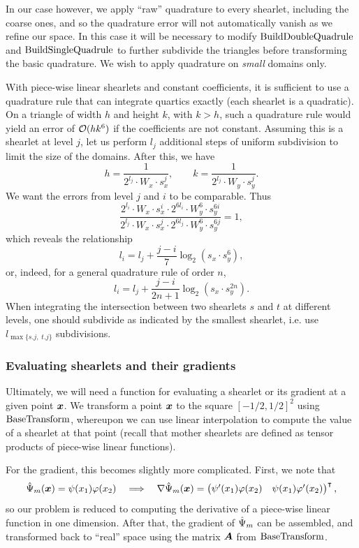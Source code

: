 In our case however, we apply ``raw'' quadrature to every shearlet, including the coarse ones, and so the
quadrature error will not automatically vanish as we refine our space. In this case it will be necessary to
modify $\operatorname{BuildDoubleQuadrule}$ and $\operatorname{BuildSingleQuadrule}$ to further subdivide the triangles before transforming the
basic quadrature. We wish to apply quadrature on {\em small} domains only.

With piece-wise linear shearlets and constant coefficients, it is sufficient to use a quadrature rule that can
integrate quartics exactly (each shearlet is a quadratic). On a triangle of width $h$ and height $k$, with
$k>h$, such a quadrature rule would yield an error of $\mathcal{O}(hk^6)$ if the coefficients are not constant.
Assuming this is a shearlet at level $j$, let us perform $l_j$ additional steps of uniform subdivision to
limit the size of the domains. After this, we have
\[
    h = \frac{1}{2^{l_j}\cdot W_x\cdot s_x^j},\qquad k = \frac{1}{2^{l_j}\cdot W_y\cdot s_y^j}. 
\]
We want the errors from level $j$ and $i$ to be comparable. Thus
\[
    \frac{2^{l_i}\cdot W_x\cdot s_x^i\cdot 2^{6l_i}\cdot W_y^6\cdot s_y^{6i}}
         {2^{l_j}\cdot W_x\cdot s_x^j\cdot 2^{6l_j}\cdot W_y^6\cdot s_y^{6j}} = 1,
\]
which reveals the relationship
\[
    l_i = l_j + \frac{j-i}{7}\log_2\left(s_x\cdot s_y^6\right),
\]
or, indeed, for a general quadrature rule of order $n$,
\[
    l_i = l_j + \frac{j-i}{2n+1}\log_2\left(s_x\cdot s_y^{2n}\right).
\]
When integrating the intersection between two shearlets $s$ and $t$ at different levels, one should subdivide
as indicated by the smallest shearlet, i.e. use $l_{\max\{s.j,\;t.j\}}$ subdivisions.

\subsubsection{Evaluating shearlets and their gradients}

Ultimately, we will need a function for evaluating a shearlet or its gradient at a given point ${\bm x}$.  We
transform a point ${\bm x}$ to the square $[-1/2,1/2]^2$ using $\operatorname{BaseTransform}$, whereupon we can use linear
interpolation to compute the value of a shearlet at that point (recall that mother shearlets are defined as
tensor products of piece-wise linear functions).

For the gradient, this becomes slightly more complicated. First, we note that
\[ 
    \hat{\Psi}_m({\bm x}) = \psi(x_1)\varphi(x_2) \quad\Longrightarrow\quad 
    \nabla\hat{\Psi}_m({\bm x}) = \begin{pmatrix} \psi'(x_1)\varphi(x_2) & \psi(x_1)\varphi'(x_2)
    \end{pmatrix}^\intercal, 
\] 
so our problem is reduced to computing the derivative of a piece-wise linear function in one dimension. After
that, the gradient of $\hat{\Psi}_m$ can be assembled, and transformed back to ``real'' space using the matrix
${\bm A}$ from $\operatorname{BaseTransform}$.

